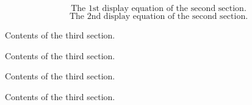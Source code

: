 \documentclass[10pt]{book}
\begin{document}

\begin{equation}\label{2.1}
\mbox {The 1st display equation of the second section.}
\end{equation}
\begin{equation}\label{2.2}
\mbox {The 2nd display equation of the second section.}
\end{equation}

\newpage
\lhead[\footnotesize\thepage\fancyplain{}\leftmark]{}\rhead[]{\fancyplain{}\rightmark\footnotesize\thepage}%


\setcounter{chapter}{3}
\setcounter{equation}{0} %

Contents of the third section.

Contents of the third section.

Contents of the third section.

Contents of the third section.
\end{document}
